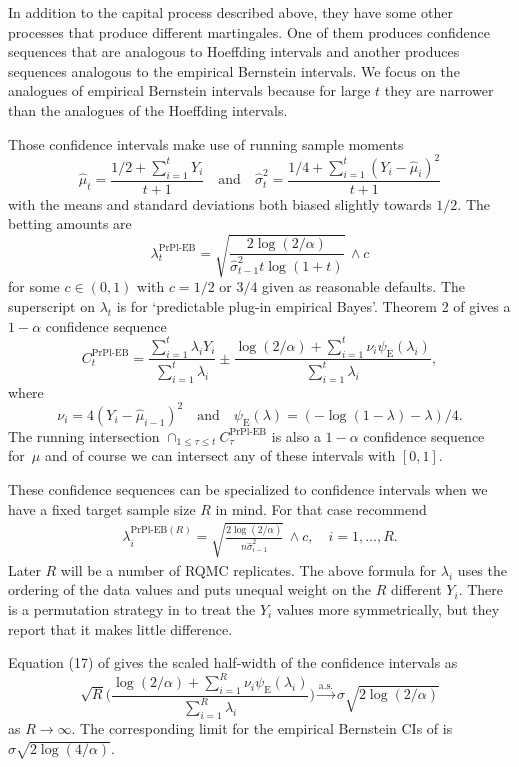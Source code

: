 \documentclass{article}
\renewcommand{\le}{\leqslant}
\newcommand{\toas}{\stackrel{\mathrm{a.s.}}{\to}}
\newcommand{\prpleb}{\text{PrPl-EB}}
\newcommand{\eb}{\mathrm{E}}
\begin{document}
In addition to the capital process described
above, they have some other processes that
produce different martingales. One of them produces confidence
sequences that are analogous to Hoeffding intervals
and another produces sequences analogous to the
empirical Bernstein intervals.  We focus on the analogues 
of empirical Bernstein intervals because for large $t$
they are narrower than the analogues of the Hoeffding intervals.


Those confidence intervals make use of running sample moments
$$
\hat\mu_t = \frac{1/2+\sum_{i=1}^tY_i}{t+1}
\quad\text{and}\quad
\hat\sigma^2_t = \frac{1/4+\sum_{i=1}^t(Y_i-\hat\mu_i)^2}{t+1}
$$
with the means and standard deviations 
both biased slightly towards $1/2$.
The betting amounts are
$$
\lambda_t^\prpleb = \sqrt{\frac{2\log(2/\alpha)}{\hat\sigma^2_{t-1}t\log(1+t)}}\,\wedge c
$$
for some $c\in(0,1)$ with $c=1/2$ or $3/4$
given as reasonable defaults. The superscript on $\lambda_t$ 
is for `predictable plug-in empirical Bayes'.
Theorem 2 of \cite{WauRam24a} 
gives a $1-\alpha$ confidence sequence
$$
C_t^\prpleb = \frac{\sum_{i=1}^t\lambda_iY_i}{\sum_{i=1}^t\lambda_i}
\pm \frac{\log(2/\alpha)+\sum_{i=1}^t\nu_i\psi_{\eb}(\lambda_i)}{\sum_{i=1}^t\lambda_i},
$$
where
$$
\nu_i = 4(Y_i-\hat\mu_{i-1})^2
\quad\text{and}\quad \psi_{\eb}(\lambda)
= (-\log(1-\lambda)-\lambda)/4.
$$
The running intersection
$\cap_{1\le\tau\le t}C^\prpleb_\tau$
is also a $1-\alpha$ confidence sequence for~$\mu$ and
of course we can intersect any of these intervals with $[0,1]$.

These confidence sequences can be specialized to confidence
intervals when we have a fixed target sample size $R$
in mind.  For that case \cite{WauRam24a}
recommend
\begin{align}\label{eq:purplelambda}
\lambda_i^{\prpleb(R)} = \sqrt{\frac{2\log(2/\alpha)}{n\hat\sigma^2_{i-1}}}\,\wedge c,\quad i=1,\dots,R.
\end{align}
Later $R$ will be a number of RQMC replicates.
The above formula for $\lambda_i$ uses the ordering
of the data values and puts unequal weight on the
$R$ different $Y_i$. There is a permutation strategy
in \cite{WauRam24a} to treat the $Y_i$ values more
symmetrically, but they report that it makes little difference.

Equation (17) of \cite{WauRam24a} gives the
scaled half-width of the \prpleb{} confidence intervals as
$$
\sqrt{R}\biggl(\frac{\log(2/\alpha)+\sum_{i=1}^R\nu_i\psi_\eb(\lambda_i)}{\sum_{i=1}^R\lambda_i} \biggr)\toas \sigma\sqrt{2\log(2/\alpha)}
$$
as $R\to\infty$.  The corresponding limit for the empirical
Bernstein CIs of \cite{maurer2009empirical}
is $\sigma\sqrt{2\log(4/\alpha)}$.
\end{document}
